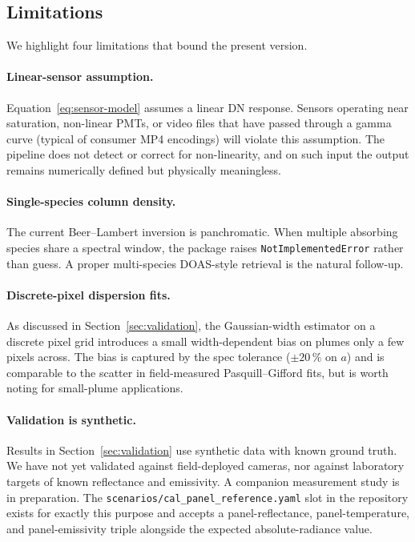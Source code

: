 \documentclass[11pt, a4paper]{article}
\begin{document}
\subsection{Limitations}

We highlight four limitations that bound the present version.

\paragraph{Linear-sensor assumption.} Equation~\ref{eq:sensor-model}
assumes a linear DN response. Sensors operating near saturation,
non-linear PMTs, or video files that have passed through a gamma curve
(typical of consumer MP4 encodings) will violate this assumption. The
pipeline does not detect or correct for non-linearity, and on such
input the output remains numerically defined but physically meaningless.

\paragraph{Single-species column density.} The current Beer--Lambert
inversion is panchromatic. When multiple absorbing species share a
spectral window, the package raises \texttt{NotImplementedError} rather
than guess. A proper multi-species DOAS-style retrieval
\cite{platt2008doas} is the natural follow-up.

\paragraph{Discrete-pixel dispersion fits.} As discussed in
Section~\ref{sec:validation}, the Gaussian-width estimator on a
discrete pixel grid introduces a small width-dependent bias on
plumes only a few pixels across. The bias is captured by the spec
tolerance ($\pm 20\,\%$ on $a$) and is comparable to the scatter in
field-measured Pasquill--Gifford fits, but is worth noting for
small-plume applications.

\paragraph{Validation is synthetic.} Results in
Section~\ref{sec:validation} use synthetic data with known ground
truth. We have not yet validated against field-deployed cameras, nor
against laboratory targets of known reflectance and emissivity. A
companion measurement study is in preparation. The
\texttt{scenarios/cal\_panel\_reference.yaml} slot in the repository
exists for exactly this purpose and accepts a panel-reflectance,
panel-temperature, and panel-emissivity triple
\cite{hapke1981bidirectional} alongside the expected absolute-radiance
value.
\end{document}
